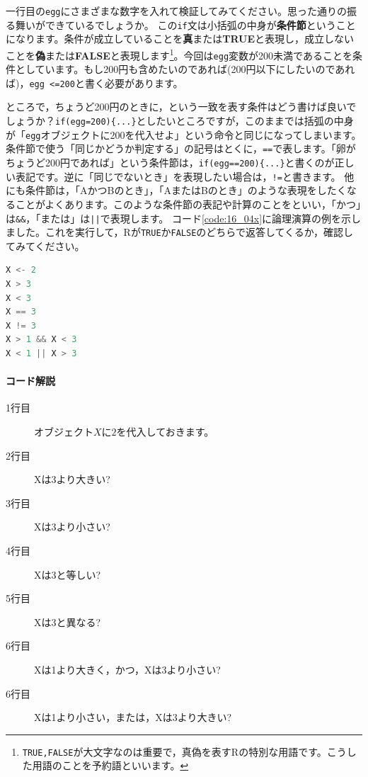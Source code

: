 \documentclass{ltjsbook}
\begin{document}
一行目の\verb|egg|にさまざまな数字を入れて検証してみてください。思った通りの振る舞いができているでしょうか。
この\texttt{if}文は小括弧の中身が\textbf{条件節}ということになります。条件が成立していることを\textbf{真}または\textbf{TRUE}と表現し，成立しないことを\textbf{偽}または\textbf{FALSE}と表現します\footnote{\texttt{TRUE,FALSE}が大文字なのは重要で，真偽を表すRの特別な用語です。こうした用語のことを予約語といいます。}。今回は\verb|egg|変数が200未満であることを条件としています。もし200円も含めたいのであれば(200円以下にしたいのであれば)，\verb|egg <=200|と書く必要があります。

ところで，ちょうど200円のときに，という一致を表す条件はどう書けば良いでしょうか？\verb|if(egg=200){...}|としたいところですが，このままでは括弧の中身が「\verb|egg|オブジェクトに200を代入せよ」という命令と同じになってしまいます。
条件節で使う「同じかどうか判定する」の記号はとくに，\verb|==|で表します。「卵がちょうど200円であれば」という条件節は，\verb|if(egg==200){...}|と書くのが正しい表記です。逆に「同じでないとき」を表現したい場合は，\verb|!=|と書きます。
他にも条件節は，「AかつBのとき」，「AまたはBのとき」のような表現をしたくなることがよくあります。このような条件節の表記や計算のことをといい，「かつ」は\verb|&&|，「または」は\texttt{||}で表現します。
コード\ref{code:16_04x}に論理演算の例を示しました。これを実行して，Rが\verb|TRUE|か\verb|FALSE|のどちらで返答してくるか，確認してみてください。

\begin{lstlisting}[language=c++,label={code:16_04x},caption={論理演算}]
X <- 2
X > 3
X < 3
X == 3
X != 3
X > 1 && X < 3
X < 1 || X > 3
\end{lstlisting}
\paragraph{コード解説}
\begin{description}
	\item[1行目] オブジェクト$X$に$2$を代入しておきます。
	\item[2行目] Xは3より大きい?
	\item[3行目] Xは3より小さい?
	\item[4行目] Xは3と等しい?
	\item[5行目] Xは3と異なる?
	\item[6行目] Xは1より大きく，かつ，Xは3より小さい?
	\item[6行目] Xは1より小さい，または，Xは3より大きい?
\end{description}
\end{document}
